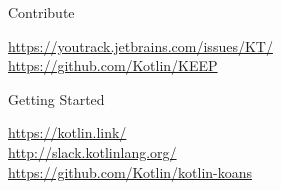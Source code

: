 {
%

\begin{frame}{Contribute}
	\begin{center}
		\LARGE \href{https://youtrack.jetbrains.com/issues/KT/}{https://youtrack.jetbrains.com/issues/KT/}\\
		\href{https://github.com/Kotlin/KEEP}{https://github.com/Kotlin/KEEP}
	\end{center}
\end{frame}

\begin{frame}{Getting Started}
	\begin{center}
		\LARGE \href{https://kotlin.link/}{https://kotlin.link/}\\
		\href{http://slack.kotlinlang.org/}{http://slack.kotlinlang.org/}\\
		\href{https://github.com/Kotlin/kotlin-koans}{https://github.com/Kotlin/kotlin-koans}
	\end{center}
\end{frame}
}

